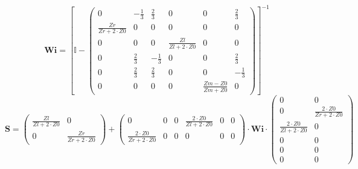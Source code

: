 \begin{equation} \mathbf{Wi} =  \left[ \mathbb{I}  -
\left(\begin{smallmatrix} 0 & -\frac{1}{3} & \frac{2}{3} & 0 & 0 &
\frac{2}{3} \\ \frac{Zr}{Zr+2\cdot Z0} & 0 & 0 & 0 & 0 & 0 \\ 0 & 0 &
0 & \frac{Zl}{Zl+2\cdot Z0} & 0 & 0 \\ 0 & \frac{2}{3} & -\frac{1}{3}
& 0 & 0 & \frac{2}{3} \\ 0 & \frac{2}{3} & \frac{2}{3} & 0 & 0 &
-\frac{1}{3} \\ 0 & 0 & 0 & 0 & \frac{ Zm -Z0}{ Zm +Z0} & 0
\end{smallmatrix}\right) \right]^{-1}  \end{equation}
\begin{equation} \mathbf{S} = \left(\begin{smallmatrix}
\frac{Zl}{Zl+2\cdot Z0} & 0 \\ 0 & \frac{Zr}{Zr+2\cdot Z0}
\end{smallmatrix}\right) + \left(\begin{smallmatrix} 0 & 0 & 0 &
\frac{2\cdot Z0}{Zl+2\cdot Z0} & 0 & 0 \\ \frac{2\cdot Z0}{Zr+2\cdot
Z0} & 0 & 0 & 0 & 0 & 0 \end{smallmatrix}\right) \cdot \mathbf{Wi}
\cdot\left(\begin{smallmatrix} 0 & 0 \\ 0 & \frac{2\cdot Z0}{Zr+2\cdot
Z0} \\ \frac{2\cdot Z0}{Zl+2\cdot Z0} & 0 \\ 0 & 0 \\ 0 & 0 \\ 0 & 0
\end{smallmatrix}\right) \end{equation}
